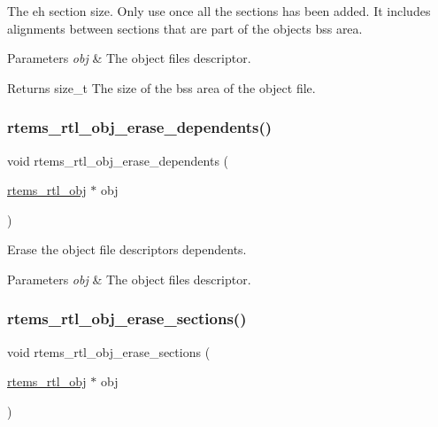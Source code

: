 The eh section size. Only use once all the sections has been added. It includes alignments between sections that are part of the object\textquotesingle{}s bss area.


\begin{DoxyParams}{Parameters}
{\em obj} & The object file\textquotesingle{}s descriptor. \\
\hline
\end{DoxyParams}
\begin{DoxyReturn}{Returns}
size\+\_\+t The size of the bss area of the object file. 
\end{DoxyReturn}
\mbox{\label{rtl-obj_8c_aea8861e811c36196e95b439e33707484}} 
\subsubsection{\texorpdfstring{rtems\_rtl\_obj\_erase\_dependents()}{rtems\_rtl\_obj\_erase\_dependents()}}
{\footnotesize\ttfamily void rtems\+\_\+rtl\+\_\+obj\+\_\+erase\+\_\+dependents (\begin{DoxyParamCaption}\item[{\mbox{\hyperlink{structrtems__rtl__obj}{rtems\+\_\+rtl\+\_\+obj}} $\ast$}]{obj }\end{DoxyParamCaption})}

Erase the object file descriptor\textquotesingle{}s dependents.


\begin{DoxyParams}{Parameters}
{\em obj} & The object file\textquotesingle{}s descriptor. \\
\hline
\end{DoxyParams}
\mbox{\label{rtl-obj_8c_a35b64d2ab1e6c8fa1a82dfa0a14ea1e0}} 
\subsubsection{\texorpdfstring{rtems\_rtl\_obj\_erase\_sections()}{rtems\_rtl\_obj\_erase\_sections()}}
{\footnotesize\ttfamily void rtems\+\_\+rtl\+\_\+obj\+\_\+erase\+\_\+sections (\begin{DoxyParamCaption}\item[{\mbox{\hyperlink{structrtems__rtl__obj}{rtems\+\_\+rtl\+\_\+obj}} $\ast$}]{obj }\end{DoxyParamCaption})}

